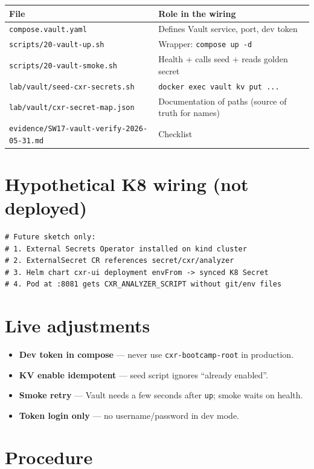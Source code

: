 \documentclass[11pt,a4paper]{report}
\begin{document}
\begin{longtable}{@{}p{5.2cm}p{7.8cm}@{}}
\toprule
File & Role in the wiring \\
\midrule
\endhead
\texttt{compose.vault.yaml} & Defines Vault service, port, dev token \\
\texttt{scripts/20-vault-up.sh} & Wrapper: \texttt{compose up -d} \\
\texttt{scripts/20-vault-smoke.sh} & Health + calls seed + reads golden secret \\
\texttt{lab/vault/seed-cxr-secrets.sh} & \texttt{docker exec vault kv put ...} \\
\texttt{lab/vault/cxr-secret-map.json} & Documentation of paths (source of truth for names) \\
\texttt{evidence/SW17-vault-verify-2026-05-31.md} & Checklist \\
\bottomrule
\end{longtable}

\chapter{Hypothetical K8 wiring (not deployed)}

\begin{lstlisting}[style=bash]
# Future sketch only:
# 1. External Secrets Operator installed on kind cluster
# 2. ExternalSecret CR references secret/cxr/analyzer
# 3. Helm chart cxr-ui deployment envFrom -> synced K8 Secret
# 4. Pod at :8081 gets CXR_ANALYZER_SCRIPT without git/env files
\end{lstlisting}

\chapter{Live adjustments}

\begin{itemize}
  \item \textbf{Dev token in compose} --- never use \texttt{cxr-bootcamp-root} in production.
  \item \textbf{KV enable idempotent} --- seed script ignores ``already enabled''.
  \item \textbf{Smoke retry} --- Vault needs a few seconds after \texttt{up}; smoke waits on health.
  \item \textbf{Token login only} --- no username/password in dev mode.
\end{itemize}

\chapter{Procedure}
\end{document}
